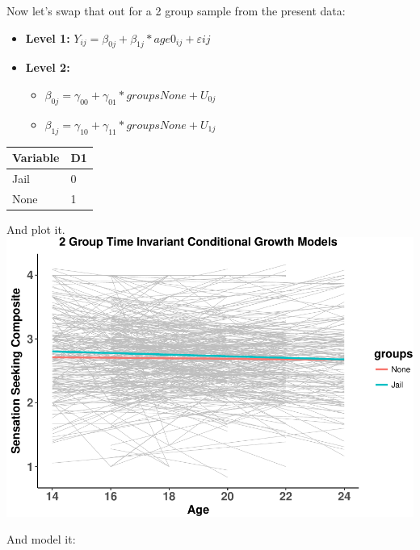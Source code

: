 \documentclass[]{article}
\newenvironment{Shaded}{\begin{snugshade}}{\end{snugshade}}
\newcommand{\KeywordTok}[1]{\textcolor[rgb]{0.13,0.29,0.53}{\textbf{#1}}}
\newcommand{\DataTypeTok}[1]{\textcolor[rgb]{0.13,0.29,0.53}{#1}}
\newcommand{\StringTok}[1]{\textcolor[rgb]{0.31,0.60,0.02}{#1}}
\newcommand{\OperatorTok}[1]{\textcolor[rgb]{0.81,0.36,0.00}{\textbf{#1}}}
\newcommand{\NormalTok}[1]{#1}
\begin{document}
Now let's swap that out for a 2 group sample from the present data:

\begin{itemize}
  \item \textbf{Level 1:} $Y_{ij} = \beta_{0j} + \beta_{1j}*age0_{ij} + \varepsilon{ij}$
  \item \textbf{Level 2:} 
    \begin{itemize} 
      \item $\beta_{0j} = \gamma_{00} + \gamma_{01}*groupsNone + U_{0j}$
      \item $\beta_{1j} = \gamma_{10} + \gamma_{11}*groupsNone + U_{1j}$
    \end{itemize}
\end{itemize}

\begin{longtable}[]{@{}ll@{}}
\toprule
Variable & D1\tabularnewline
\midrule
\endhead
Jail & 0\tabularnewline
None & 1\tabularnewline
\bottomrule
\end{longtable}

And plot it.\\
\includegraphics{Conditional_Models_doc_files/figure-latex/unnamed-chunk-9-1.pdf}

And model it:\\
\small

\begin{Shaded}
\end{Shaded}
\end{document}

